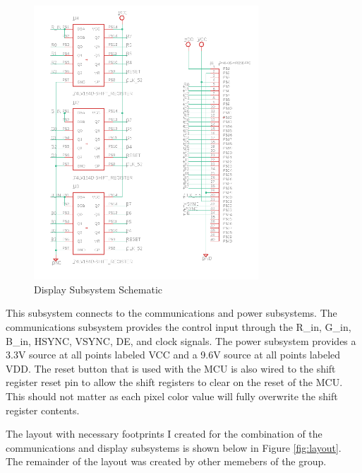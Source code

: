 \documentclass[12pt]{article}
\begin{document}
\begin{figure}[!h]
	\centering
	\includegraphics[width=0.75\textwidth]{disp_schem.png}
	\caption{Display Subsystem Schematic}
	\label{fig:disp_schem}
\end{figure}

This subsystem connects to the communications and power subsystems. The communications subsystem provides the control input through the R\_in, G\_in, B\_in, HSYNC, VSYNC, DE, and clock signals. The power subsystem provides a 3.3V source at all points labeled VCC and a 9.6V source at all points labeled VDD. The reset button that is used with the MCU is also wired to the shift register reset pin to allow the shift registers to clear on the reset of the MCU. This should not matter as each pixel color value will fully overwrite the shift register contents.

The layout with necessary footprints I created for the combination of the communications and display subsystems is shown below in Figure \ref{fig:layout}. The remainder of the layout was created by other memebers of the group.
\end{document}
